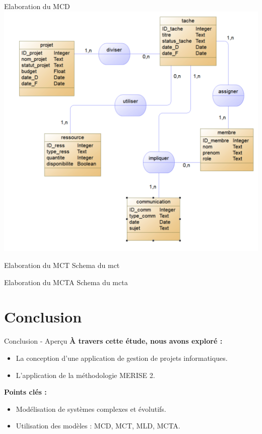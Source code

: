 \documentclass{beamer}
\begin{document}
\begin{frame}{Elaboration du MCD}
    \centering
    \hypertarget{fig8}{\includegraphics[width=\textwidth, height=0.8\textheight, keepaspectratio]{mcd.png}}
    \caption{Fig. Schema du MCD}
\end{frame}



\begin{frame}{Elaboration du MCT}
    Schema du mct
    
    \label{fig9}
\end{frame}

\begin{frame}{Elaboration du MCTA}
    Schema du mcta
    
    \label{fig10}
\end{frame}

\section{Conclusion}

\begin{frame}{Conclusion - Aperçu}
    \textbf{À travers cette étude, nous avons exploré :}
    \begin{itemize}
        \item La conception d'une application de gestion de projets informatiques.
        \item L'application de la méthodologie MERISE 2.
    \end{itemize}
    \vspace{0.5cm}
    \textbf{Points clés :}
    \begin{itemize}
        \item Modélisation de systèmes complexes et évolutifs.
        \item Utilisation des modèles : MCD, MCT, MLD, MCTA.
    \end{itemize}
\end{frame}
\end{document}
